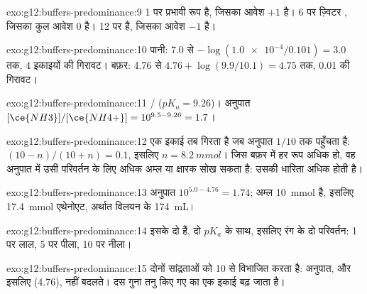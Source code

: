 \begin{solution}{exo:g12:buffers-predominance:9}
 1 पर प्रभावी रूप   है, जिसका आवेश $+1$ है।  6 पर ज़्विटर ,
जिसका कुल आवेश 0 है।  12 पर   है, जिसका आवेश $-1$ है।
\end{solution}

\begin{solution}{exo:g12:buffers-predominance:10}
पानी: 7.0 से $-\log(\num{1.0e-4}/0.101) = 3.0$ तक, 4 इकाइयों की गिरावट।
बफ़र: 4.76 से $4.76 + \log(9.9/10.1) = 4.75$ तक, 0.01 की गिरावट।
\end{solution}

\begin{solution}{exo:g12:buffers-predominance:11}
/ ($pK_a = 9.26$)। अनुपात
$[\ce{NH3}]/[\ce{NH4+}] = 10^{9.5 - 9.26} = 1.7$।
\end{solution}

\begin{solution}{exo:g12:buffers-predominance:12}
 एक इकाई तब गिरता है जब अनुपात $1/10$ तक पहुँचता है:
$(10 - n)/(10 + n) = 0.1$, इसलिए $n = \qty{8.2}{mmol}$। जिस बफ़र में हर रूप
अधिक हो, वह अनुपात में उसी परिवर्तन के लिए अधिक अम्ल या क्षारक सोख सकता है:
उसकी धारिता अधिक होती है।
\end{solution}

\begin{solution}{exo:g12:buffers-predominance:13}
अनुपात $10^{5.0 - 4.76} = 1.74$; अम्ल \qty{10}{mmol} है, इसलिए
\qty{17.4}{mmol} एथेनोएट, अर्थात विलयन के \qty{174}{mL}।
\end{solution}

\begin{solution}{exo:g12:buffers-predominance:14}
इसके दो  हैं, दो $pK_a$ के साथ, इसलिए रंग के दो परिवर्तन:
 1 पर लाल,  5 पर पीला,  10 पर नीला।
\end{solution}

\begin{solution}{exo:g12:buffers-predominance:15}
 दोनों सांद्रताओं को 10 से विभाजित करता है: अनुपात, और इसलिए 
(4.76), नहीं बदलते। दस गुना तनु किए गए  का  एक
इकाई बढ़ जाता है।
\end{solution}

